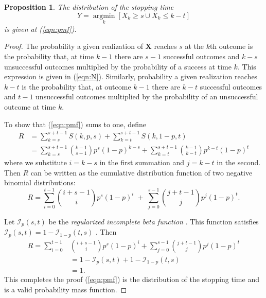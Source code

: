 \documentclass[review]{elsarticle}
\DeclareMathOperator*{\argmin}{argmin}
\newcommand*{\argminl}{\argmin\limits}
\newtheorem{prop}{Proposition}
\begin{document}
\begin{prop}
The distribution of the stopping time
\begin{equation*}
Y = \argminl_k \left[X_k \geq s \cup X_k \leq k-t \right]
\end{equation*}
is given at (\ref{eqn:pmf}).
\end{prop}
\begin{proof}

The probability a given realization of $\mathbf{X}$ reaches $s$ at
the $k$th outcome is the probability that, at time $k-1$ there are $s-1$
successful outcomes and $k-s$ unsuccessful outcomes multiplied by
the probability of a success at time $k$. This expression is given
in (\ref{eqn:N}). 
Similarly, probability a given realization reaches $k-t$
is the probability that, at outcome $k-1$ there are $k-t$ successful outcomes
and $t-1$ unsuccessful outcomes multiplied by the probability of an
unsuccessful outcome at time $k$.  


To show that (\ref{eqn:pmf}) sums to one, define
\begin{align} \label{eqn:sum_proof}
R &= \sum_{k=s}^{s+t-1} S(k, p, s) + \sum_{k=t}^{s+t-1} S(k, 1-p, t) \\
  &= \sum_{k=s}^{s+t-1} {k-1 \choose s-1} p^s (1-p)^{k-s} + \sum_{k=t}^{s+t-1} {k-1 \choose k-t} p^{k-t} (1-p)^t
\end{align}
where we substitute $i=k-s$ in the first summation and $j=k-t$ in the second.
Then $R$ can be written as the cumulative distribution function of two
negative binomial distributions:
\begin{equation} \label{eqn:transformed_sum}
R = \sum_{i=0}^{t-1} {i+s-1 \choose i} p^s (1-p)^i \; + \;
\sum_{j=0}^{s-1} {j+t-1 \choose j} p^j (1-p)^t.
\end{equation}

Let $\mathcal{I}_p(s, t)$ be the {\em regularized incomplete beta function} 
\citep{Olver2010}. This function satisfies 
$\mathcal{I}_p(s, t) = 1-\mathcal{I}_{1-p}(t, s)$ \citep{Uppuluri1970}. Then
\begin{align*}
R = \sum_{i=0}^{t-1} &{i+s-1 \choose i} p^s (1-p)^i +
\sum_{j=0}^{s-1}  {j+t-1 \choose j} p^j  (1-p)^t \\
   &= 1-\mathcal{I}_p(s, t) + 1 - \mathcal{I}_{1-p}(t, s) \\
   &= 1. 
\end{align*}
This completes the proof (\ref{eqn:pmf}) is the distribution of the
stopping time and is a valid probability mass function.
\end{proof}
\end{document}
